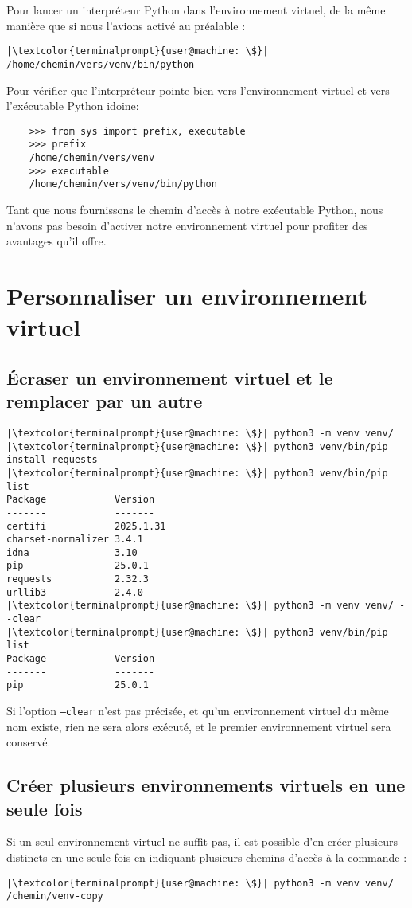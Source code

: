 Pour lancer un interpréteur Python dans l'environnement virtuel, de la même manière que si nous l'avions activé au préalable :
\begin{lstlisting}[style=terminal]
|\textcolor{terminalprompt}{user@machine: \$}| /home/chemin/vers/venv/bin/python
\end{lstlisting}

Pour vérifier que l'interpréteur pointe bien vers l'environnement virtuel  et vers l'exécutable Python idoine:
\begin{verbatim}
    >>> from sys import prefix, executable
    >>> prefix
    /home/chemin/vers/venv
    >>> executable
    /home/chemin/vers/venv/bin/python
\end{verbatim}

Tant que nous fournissons le chemin d'accès à notre exécutable Python, nous n'avons pas besoin d'activer notre environnement virtuel pour profiter des avantages qu'il offre.

\section{Personnaliser un environnement virtuel}
\subsection*{Écraser un environnement virtuel et le remplacer par un autre}
\begin{lstlisting}[style=terminal]
|\textcolor{terminalprompt}{user@machine: \$}| python3 -m venv venv/
|\textcolor{terminalprompt}{user@machine: \$}| python3 venv/bin/pip install requests
|\textcolor{terminalprompt}{user@machine: \$}| python3 venv/bin/pip list
Package            Version
-------            -------
certifi            2025.1.31
charset-normalizer 3.4.1
idna               3.10
pip                25.0.1
requests           2.32.3
urllib3            2.4.0
|\textcolor{terminalprompt}{user@machine: \$}| python3 -m venv venv/ --clear
|\textcolor{terminalprompt}{user@machine: \$}| python3 venv/bin/pip list
Package            Version
-------            -------
pip                25.0.1
\end{lstlisting}

Si l'option \texttt{--clear} n'est pas précisée, et qu'un environnement virtuel du même nom existe, rien ne sera alors exécuté, et le premier environnement virtuel sera conservé.

\subsection*{Créer plusieurs environnements virtuels en une seule fois}
Si un seul environnement virtuel ne suffit pas, il est possible d'en créer plusieurs distincts en une seule fois en indiquant plusieurs chemins d'accès à la commande :
\begin{lstlisting}[style=terminal]
|\textcolor{terminalprompt}{user@machine: \$}| python3 -m venv venv/ /chemin/venv-copy
\end{lstlisting}

